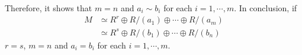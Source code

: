 Therefore, it shows that \(m = n\) and \(a_i \sim b_i\) for each \(i = 1, \cdots, m\).
\br
\noindent
In conclusion, if
\begin{align*}
  M &\simeq R^r \oplus R/(a_1) \oplus \cdots \oplus R/(a_m)
  \\&\simeq R^s \oplus R/(b_1) \oplus \cdots \oplus R/(b_n)
\end{align*}
\(r = s\), \(m = n\) and \(a_i = b_i\) for each \(i = 1, \cdots, m\).
\qedsq
